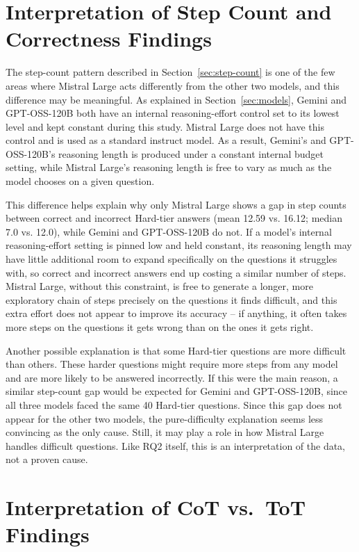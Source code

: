 \section{Interpretation of Step Count and Correctness Findings}

The step-count pattern described in Section~\ref{sec:step-count} is one
of the few areas where Mistral Large acts differently from the other two
models, and this difference may be meaningful. As explained in
Section~\ref{sec:models}, Gemini and GPT-OSS-120B both have an internal
reasoning-effort control set to its lowest level and kept constant
during this study. Mistral Large does not have this control and is used
as a standard instruct model. As a result, Gemini's and GPT-OSS-120B's
reasoning length is produced under a constant internal budget setting,
while Mistral Large's reasoning length is free to vary as much as the
model chooses on a given question.

This difference helps explain why only Mistral Large shows a gap in step
counts between correct and incorrect Hard-tier answers (mean 12.59 vs.
16.12; median 7.0 vs. 12.0), while Gemini and GPT-OSS-120B do not. If a
model's internal reasoning-effort setting is pinned low and held
constant, its reasoning length may have little additional room to expand
specifically on the questions it struggles with, so correct and
incorrect answers end up costing a similar number of steps. Mistral
Large, without this constraint, is free to generate a longer, more
exploratory chain of steps precisely on the questions it finds
difficult, and this extra effort does not appear to improve its accuracy
-- if anything, it often takes more steps on the questions it gets wrong
than on the ones it gets right.

Another possible explanation is that some Hard-tier questions are more
difficult than others. These harder questions might require more steps
from any model and are more likely to be answered incorrectly. If this
were the main reason, a similar step-count gap would be expected for
Gemini and GPT-OSS-120B, since all three models faced the same 40
Hard-tier questions. Since this gap does not appear for the other two
models, the pure-difficulty explanation seems less convincing as the
only cause. Still, it may play a role in how Mistral Large handles
difficult questions. Like RQ2 itself, this is an interpretation of the
data, not a proven cause.

\section{Interpretation of CoT vs.\ ToT Findings}

